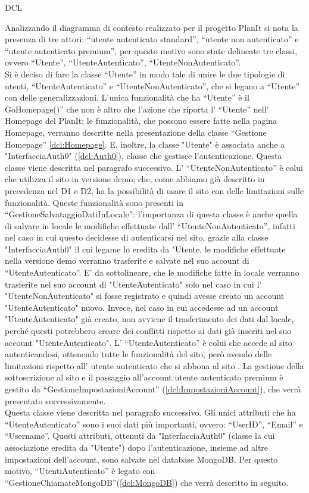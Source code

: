 \begin{listaPersonale}{DCL}

    Analizzando il diagramma di contesto realizzato per il progetto PlanIt si nota la presenza di tre attori: “utente autenticato standard”, “utente non autenticato” e “utente autenticato premium”, per questo motivo sono state delineate tre classi, ovvero “Utente”, “UtenteAutenticato”, “UtenteNonAutenticato”.\\
    Si è deciso di fare la classe “Utente” in modo tale di unire le due tipologie di utenti, “UtenteAutenticato” e “UtenteNonAutenticato”, che si legano a “Utente” con delle generalizzazioni. L'unica funzionalità che ha “Utente” è il GoHomepage()” che non è altro che l'azione che riporta l' “Utente” nell' Homepage del PlanIt; le funzionalità, che possono essere fatte nella pagina Homepage, verranno descritte nella presentazione della classe “Gestione Homepage” \ref{dcl:Homepage}. E, inoltre, la classe "Utente" è associata anche a "InterfacciaAuth0" (\ref{dcl:Auth0}), classe che gestisce l'autenticazione. Questa classe viene descritta nel paragrafo successivo.
    L' “UtenteNonAutenticato” è colui che utilizza il sito in versione demo; che, come abbiamo già descritto in precedenza nel D1 e D2, ha la possibilità di usare il sito con delle limitazioni sulle funzionalità. Queste funzionalità sono presenti in “GestioneSalvataggioDatiInLocale”: l'importanza di questa classe è anche quella di salvare in locale le modifiche effettuate dall' “UtenteNonAutenticato”, infatti nel caso in cui questo decidesse di autenticarsi nel sito, grazie alla classe "InterfacciaAuth0" il cui legame lo eredita da "Utente, le modifiche effettuate nella versione demo verranno trasferite e salvate nel suo account di “UtenteAutenticato”. E' da sottolineare, che le modifiche fatte in locale verranno trasferite nel suo account di "UtenteAutenticato" solo nel caso in cui l' "UtenteNonAutenticato" si fosse registrato e quindi avesse creato un account "UtenteAutenticato" nuovo. Invece, nel caso in cui accedesse ad un account "UtenteAutenticato" già creato, non avviene il trasferimento dei dati dal locale, perché questi potrebbero creare dei conflitti rispetto ai dati già inseriti nel suo account "UtenteAutenticato".
    L' “UtenteAutenticato” è colui che accede al sito autenticandosi, ottenendo tutte le funzionalità del sito, però avendo delle limitazioni rispetto all' utente autenticato che si abbona al sito . La gestione della sottoscrizione al sito e il passaggio all'account utente autenticato premium è gestito da “GestioneImpostazioniAccount” (\ref{dcl:ImpostazioniAccount}), che verrà presentato successivamente.\\
    Questa classe viene descritta nel paragrafo successivo. Gli unici attributi che ha “UtenteAutenticato” sono i suoi dati più importanti, ovvero: “UserID”, “Email” e “Username”. Questi attributi, ottenuti da "InterfacciaAuth0" (classe la cui associazione eredita da "Utente") dopo l'autenticazione, insieme ad altre impostazioni dell'account, sono salvate nel database MongoDB. Per questo motivo, “UtentiAutenticato” è legato con “GestioneChiamateMongoDB”(\ref{dcl:MongoDB}) che verrà descritto in seguito.



\end{listaPersonale}
